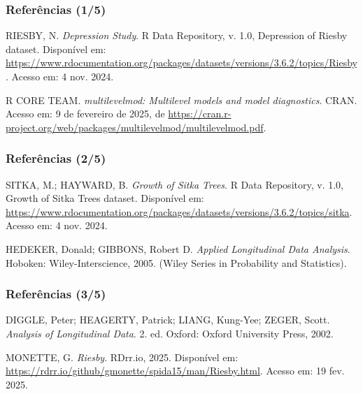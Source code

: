 \begin{frame}
	\frametitle{Referências (1/5)}
	
	\begin{thebibliography}{99}
		
		RIESBY, N. \textit{Depression Study}. R Data Repository, v. 1.0, Depression of Riesby dataset. Disponível em: \url{https://www.rdocumentation.org/packages/datasets/versions/3.6.2/topics/Riesby}. Acesso em: 4 nov. 2024.
		
		R CORE TEAM. \textit{multilevelmod: Multilevel models and model diagnostics}. CRAN. Acesso em: 9 de fevereiro de 2025, de \url{https://cran.r-project.org/web/packages/multilevelmod/multilevelmod.pdf}.
		
	\end{thebibliography}
\end{frame}

\begin{frame}
	\frametitle{Referências (2/5)}
	
	\begin{thebibliography}{99}
		
		SITKA, M.; HAYWARD, B. \textit{Growth of Sitka Trees}. R Data Repository, v. 1.0, Growth of Sitka Trees dataset. Disponível em: \url{https://www.rdocumentation.org/packages/datasets/versions/3.6.2/topics/sitka}. Acesso em: 4 nov. 2024.
		
		HEDEKER, Donald; GIBBONS, Robert D. \textit{Applied Longitudinal Data Analysis}. Hoboken: Wiley-Interscience, 2005. (Wiley Series in Probability and Statistics).
		
	\end{thebibliography}
\end{frame}

\begin{frame}
	\frametitle{Referências (3/5)}
	
	\begin{thebibliography}{99}
		
		DIGGLE, Peter; HEAGERTY, Patrick; LIANG, Kung-Yee; ZEGER, Scott. \textit{Analysis of Longitudinal Data}. 2. ed. Oxford: Oxford University Press, 2002.
		
		MONETTE, G. \textit{Riesby}. RDrr.io, 2025. Disponível em: \url{https://rdrr.io/github/gmonette/spida15/man/Riesby.html}. Acesso em: 19 fev. 2025.
		
	\end{thebibliography}
\end{frame}


